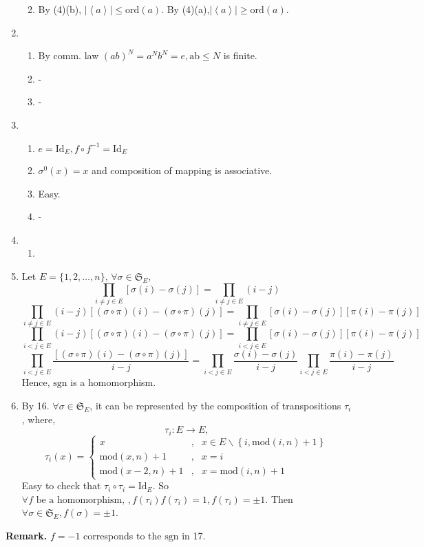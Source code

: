 \documentclass[12pt]{article}
\begin{document}
\begin{enumerate}
\begin{enumerate}
\begin{enumerate}
                \end{enumerate}
            \item By (4)(b), $\left|\left \langle a \right \rangle \right|\le \mathrm{ord}(a)$. By (4)(a),$\left|\left \langle a \right \rangle \right|\ge \mathrm{ord}(a)$.
        \end{enumerate}
    \item 
        \begin{enumerate}
            \item By comm. law $(ab)^{N}=a^N b^N=e, \mathrm{ab}\le N$ is finite.
            \item -
            \item -
        \end{enumerate}
    \item 
        \begin{enumerate}
            \item $e=\mathrm{Id}_E,f\circ f^{-1}=\mathrm{Id}_E$
            \item $\sigma^0(x)=x$ and composition of mapping is associative.
            \item Easy.
            \item -
        \end{enumerate}
    \item 
        \begin{enumerate}
            \item 
        \end{enumerate}
    \item Let $E=\{1,2,\dots,n\}$, $\forall \sigma\in \mathfrak{S}_E,$
            $$\prod_{i\not=j\in E}[\sigma(i)-\sigma(j)]=\prod_{i\not=j\in E}(i-j)$$
            $$\prod_{i\not=j\in E}(i-j)[(\sigma\circ \pi) (i)-(\sigma\circ\pi)(j)]=\prod_{i\not=j\in E}[\sigma(i)-\sigma(j)][\pi(i)-\pi(j)]$$
            $$\prod_{i<j\in E}(i-j)[(\sigma\circ \pi) (i)-(\sigma\circ\pi)(j)]=\prod_{i<j\in E}[\sigma(i)-\sigma(j)][\pi(i)-\pi(j)]$$
            $$\prod_{i<j\in E}\frac{[(\sigma\circ \pi) (i)-(\sigma\circ\pi)(j)]}{i-j}=\prod_{i<j\in E}\frac{\sigma(i)-\sigma(j)}{i-j}\prod_{i<j\in E}\frac{\pi(i)-\pi(j)}{i-j}$$
            Hence, $\mathrm{sgn}$ is a homomorphism.
    \item By 16. $\forall \sigma \in \mathfrak{S}_E$, it can be represented by the composition of transpositions $\tau_i$, where,
        $$\tau_i: E\longrightarrow E,$$$$ \tau_i(x)=
        \left\{\begin{matrix}
        x&,&x\in E\backslash \left \{ i,\mathrm{mod} (i ,n)+1\right \} \\
        \mathrm{mod}(x,n)+1&,&x=i \\
        \mathrm{mod}( x-2,n)+1&,&x=\mathrm{mod}(i,n)+1
        \end{matrix}\right.$$
        Easy to check that $\tau_i\circ\tau_i=\mathrm{Id}_E$. So $\forall f \text{ be a homomorphism, },f(\tau_i)f(\tau_i)=1,f(\tau_i)=\pm 1$. Then $\forall \sigma \in \mathfrak{S}_E, f(\sigma)=\pm1$.
\end{enumerate}
\textbf{Remark.  }$f=-1$ corresponds to the $\mathrm{sgn}$ in 17.
\end{document}
